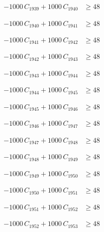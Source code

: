 \documentclass[a4paper,11pt]{article}
\begin{document}
\begin{align}
-1000\,C_{1939} + 1000\,C_{1940} &\geq 48 \nonumber
\end{align}

\begin{align}
-1000\,C_{1940} + 1000\,C_{1941} &\geq 48 \nonumber
\end{align}

\begin{align}
-1000\,C_{1941} + 1000\,C_{1942} &\geq 48 \nonumber
\end{align}

\begin{align}
-1000\,C_{1942} + 1000\,C_{1943} &\geq 48 \nonumber
\end{align}

\begin{align}
-1000\,C_{1943} + 1000\,C_{1944} &\geq 48 \nonumber
\end{align}

\begin{align}
-1000\,C_{1944} + 1000\,C_{1945} &\geq 48 \nonumber
\end{align}

\begin{align}
-1000\,C_{1945} + 1000\,C_{1946} &\geq 48 \nonumber
\end{align}

\begin{align}
-1000\,C_{1946} + 1000\,C_{1947} &\geq 48 \nonumber
\end{align}

\begin{align}
-1000\,C_{1947} + 1000\,C_{1948} &\geq 48 \nonumber
\end{align}

\begin{align}
-1000\,C_{1948} + 1000\,C_{1949} &\geq 48 \nonumber
\end{align}

\begin{align}
-1000\,C_{1949} + 1000\,C_{1950} &\geq 48 \nonumber
\end{align}

\begin{align}
-1000\,C_{1950} + 1000\,C_{1951} &\geq 48 \nonumber
\end{align}

\begin{align}
-1000\,C_{1951} + 1000\,C_{1952} &\geq 48 \nonumber
\end{align}

\begin{align}
-1000\,C_{1952} + 1000\,C_{1953} &\geq 48 \nonumber
\end{align}
\end{document}
